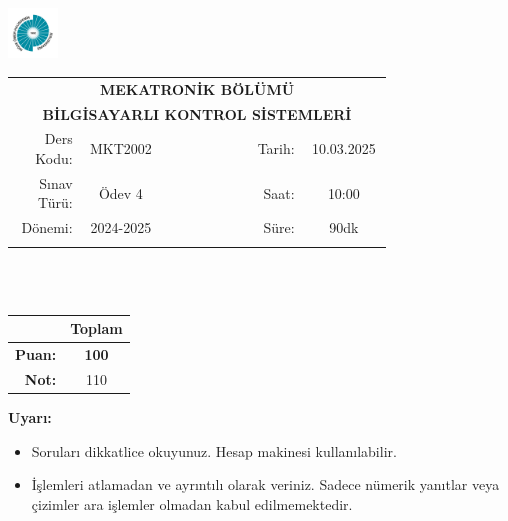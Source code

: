 \newcommand\UniversiteAdi{Niğde Ömer Halisdemir Üniversitesi}
\newcommand\BolumAdi{MEKATRONİK BÖLÜMÜ}
\newcommand\DersKodu{MKT2002}
\newcommand\DersAdi{BİLGİSAYARLI KONTROL SİSTEMLERİ}
\newcommand\SinavAdi{Ödev 4}
\newcommand\SinavTarihi{10.03.2025}
\newcommand\SinavSaati{10:00}
\newcommand\SinavSuresi{90dk}

\pagestyle{fancy}
\fancyhf{} %
\noindent \includegraphics[width=0.1\textwidth]{logo}
\begin{tabular}{
    p{0.15\linewidth}
    p{0.15\linewidth}
    p{0.2\linewidth}
    p{0.1\linewidth}
    p{0.15\linewidth}}
    \multicolumn{5}{c}{\textbf{\BolumAdi}}\\
    \multicolumn{5}{c}{\textbf{\DersAdi}}\\\hline
    \multicolumn{1}{|r|}{Ders Kodu:}&
    \multicolumn{1}{|c|}{\DersKodu}&
    \multicolumn{1}{|c|}{}& 
    \multicolumn{1}{|r|}{Tarih:}&
    \multicolumn{1}{|c|}{\SinavTarihi} \\\hline
    \multicolumn{1}{|r|}{Sınav Türü:}&
    \multicolumn{1}{|c|}{\SinavAdi}&  
    \multicolumn{1}{|c|}{}&
    \multicolumn{1}{|r|}{Saat:}&
    \multicolumn{1}{|c|}{\SinavSaati}\\\hline
    \multicolumn{1}{|r|}{Dönemi:}&
    \multicolumn{1}{|c|}{2024-2025}&
    \multicolumn{1}{|c|}{}&
    \multicolumn{1}{|r|}{Süre:}&
    \multicolumn{1}{|c|}{\SinavSuresi} \\\hline
    &&&&\\
\end{tabular}\\\\
\noindent\begin{center}
\begin{tabular}{|r|c|}\hline
    &\textbf{Toplam}\\\hline
    \textbf{Puan:} &\textbf{100}\\\hline
    \textbf{Not:}  &110\\\hline
\end{tabular}\end{center}
\noindent\textbf{Uyarı:}
\begin{itemize}\bfseries
    \item Soruları dikkatlice okuyunuz. Hesap makinesi kullanılabilir.
    \item İşlemleri atlamadan ve ayrıntılı olarak veriniz. Sadece nümerik yanıtlar veya çizimler ara işlemler olmadan kabul edilmemektedir.
\end{itemize}
